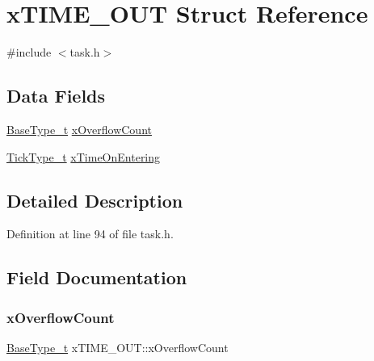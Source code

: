 \hypertarget{structx_t_i_m_e___o_u_t}{}\section{x\+T\+I\+M\+E\+\_\+\+O\+UT Struct Reference}
\label{structx_t_i_m_e___o_u_t}


{\ttfamily \#include $<$task.\+h$>$}

\subsection*{Data Fields}
\begin{DoxyCompactItemize}
\item 
\hyperlink{portmacro_8h_a46fb21e00ae0729d7515c0fbf2269796}{Base\+Type\+\_\+t} \hyperlink{structx_t_i_m_e___o_u_t_a9289c6f97096a9b3e3fc705d0bc5a160}{x\+Overflow\+Count}
\item 
\hyperlink{portmacro_8h_aa69c48c6e902ce54f70886e6573c92a9}{Tick\+Type\+\_\+t} \hyperlink{structx_t_i_m_e___o_u_t_a3464939ca050f7bcc6ffe0d8d3766337}{x\+Time\+On\+Entering}
\end{DoxyCompactItemize}


\subsection{Detailed Description}


Definition at line 94 of file task.\+h.



\subsection{Field Documentation}
\mbox{\label{structx_t_i_m_e___o_u_t_a9289c6f97096a9b3e3fc705d0bc5a160}} 
\subsubsection{\texorpdfstring{x\+Overflow\+Count}{xOverflowCount}}
{\footnotesize\ttfamily \hyperlink{portmacro_8h_a46fb21e00ae0729d7515c0fbf2269796}{Base\+Type\+\_\+t} x\+T\+I\+M\+E\+\_\+\+O\+U\+T\+::x\+Overflow\+Count}



